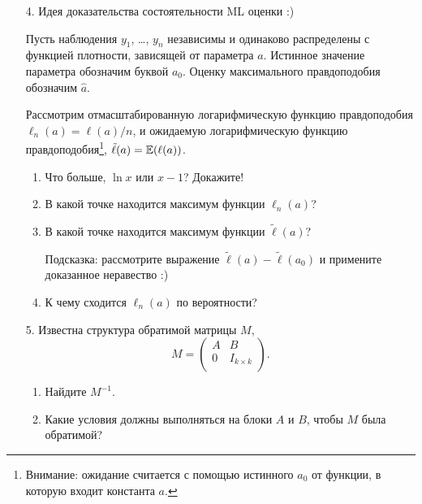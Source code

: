 \begin{enumerate}
  \item[4.] Идея доказательства состоятельности ML оценки :)

    Пусть наблюдения $y_1$, \ldots, $y_n$ независимы и одинаково распределены с функцией плотности, зависящей от параметра $a$.
    Истинное значение параметра обозначим буквой $a_0$. Оценку максимального правдоподобия обозначим $\hat a$.

    Рассмотрим отмасштабированную логарифмическую функцию правдоподобия $\ell_n(a)=\ell(a) / n$, и
    ожидаемую логарифмическую функцию правдоподобия\footnote{Внимание:
    ожидание считается с помощью истинного $a_0$ от функции, в которую входит константа $a$.},
    $\tilde \ell(a)=\mathbb{E}(\ell(a))$.
    \begin{enumerate}
      \item Что больше, $\ln x$ или $x-1$? Докажите!
      \item В какой точке находится максимум функции $\ell_n(a)$?
      \item В какой точке находится максимум функции $\tilde \ell(a)$?

	Подсказка: рассмотрите выражение $\tilde \ell(a) - \tilde \ell(a_0)$ и примените доказанное неравество :)
      \item К чему сходится $\ell_n(a)$ по вероятности?

    \end{enumerate}


  \item[5.] Известна структура обратимой матрицы $M$,
    \[
         M = \begin{pmatrix}
	   A & B \\
	   0 & I_{k\times k} \\
	 \end{pmatrix}.
    \]

    \begin{enumerate}
      \item Найдите $M^{-1}$.
      \item Какие условия должны выполняться на блоки $A$ и $B$, чтобы $M$ была обратимой?
    \end{enumerate}


\end{enumerate}
